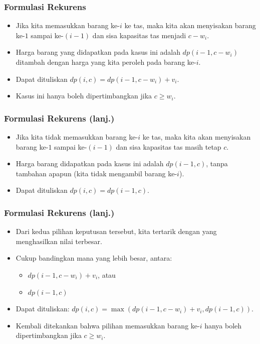 \begin{frame} 
\frametitle{Formulasi Rekurens}
\begin{itemize}
  \item Jika kita memasukkan barang ke-$i$ ke tas, maka kita akan menyisakan barang ke-$1$ sampai ke-$(i-1)$ dan sisa kapasitas tas menjadi $c-w_i$. 
  \item Harga barang yang didapatkan pada kasus ini adalah $dp(i-1,c-w_i)$ ditambah dengan harga yang kita peroleh pada barang ke-$i$.
  \item Dapat dituliskan $dp(i, c) = dp(i-1, c-w_i) + v_i$.
  \item Kasus ini hanya boleh dipertimbangkan jika $c \geq w_i$.
\end{itemize}
\end{frame}

\begin{frame} 
\frametitle{Formulasi Rekurens (lanj.)}
\begin{itemize}
  \item Jika kita tidak memasukkan barang ke-$i$ ke tas, maka kita akan menyisakan barang ke-$1$ sampai ke-$(i-1)$ dan sisa kapasitas tas masih tetap $c$.
  \item Harga barang didapatkan pada kasus ini adalah $dp(i-1,c)$, tanpa tambahan apapun (kita tidak mengambil barang ke-$i$).
  \item Dapat dituliskan $dp(i, c) = dp(i-1, c)$.
\end{itemize}
\end{frame}

\begin{frame} 
\frametitle{Formulasi Rekurens (lanj.)}
\begin{itemize}
  \item Dari kedua pilihan keputusan tersebut, kita tertarik dengan yang menghasilkan nilai terbesar.
  \item Cukup bandingkan mana yang lebih besar, antara:
  \begin{itemize}
    \item $dp(i-1, c-w_i) + v_i$, atau
    \item $dp(i-1, c)$
  \end{itemize}
  \item Dapat dituliskan: $dp(i, c) = \max(dp(i-1,c-w_i)+v_i,dp(i-1,c))$. \newline
  \item Kembali ditekankan bahwa pilihan memasukkan barang ke-$i$ hanya boleh dipertimbangkan jika $c \geq w_i$.
\end{itemize}
\end{frame}

